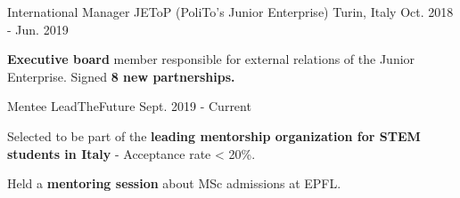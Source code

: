

\begin{cventries}

  \cventry
    {International Manager} %
    {JEToP (PoliTo's Junior Enterprise)} %
    {Turin, Italy} %
    {Oct. 2018 - Jun. 2019} %
    {
      \begin{cvitems} %
        \item {\textbf{Executive board} member responsible for external relations of the Junior Enterprise. Signed \textbf{8 new partnerships.}}
      \end{cvitems}
    }
  \cventry
    {Mentee} %
    {LeadTheFuture} %
    {} %
    {Sept. 2019 - Current} %
    {
      \begin{cvitems} %
        \item {Selected to be part of the \textbf{leading mentorship organization for STEM students in Italy} - Acceptance rate < 20\%.}
        \item {Held a \textbf{mentoring session} about MSc admissions at EPFL.}
      \end{cvitems}
    }
\end{cventries}
